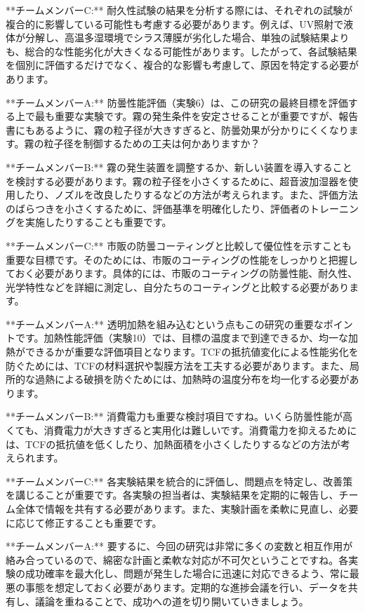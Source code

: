 \documentclass{article}
\begin{document}
**チームメンバーC:**  耐久性試験の結果を分析する際には、それぞれの試験が複合的に影響している可能性も考慮する必要があります。例えば、UV照射で液体が分解し、高温多湿環境でシラス薄膜が劣化した場合、単独の試験結果よりも、総合的な性能劣化が大きくなる可能性があります。したがって、各試験結果を個別に評価するだけでなく、複合的な影響も考慮して、原因を特定する必要があります。

**チームメンバーA:**  防曇性能評価（実験6）は、この研究の最終目標を評価する上で最も重要な実験です。霧の発生条件を安定させることが重要ですが、報告書にもあるように、霧の粒子径が大きすぎると、防曇効果が分かりにくくなります。霧の粒子径を制御するための工夫は何かありますか？

**チームメンバーB:**  霧の発生装置を調整するか、新しい装置を導入することを検討する必要があります。霧の粒子径を小さくするために、超音波加湿器を使用したり、ノズルを改良したりするなどの方法が考えられます。また、評価方法のばらつきを小さくするために、評価基準を明確化したり、評価者のトレーニングを実施したりすることも重要です。

**チームメンバーC:**  市販の防曇コーティングと比較して優位性を示すことも重要な目標です。そのためには、市販のコーティングの性能をしっかりと把握しておく必要があります。具体的には、市販のコーティングの防曇性能、耐久性、光学特性などを詳細に測定し、自分たちのコーティングと比較する必要があります。

**チームメンバーA:**  透明加熱を組み込むという点もこの研究の重要なポイントです。加熱性能評価（実験10）では、目標の温度まで到達できるか、均一な加熱ができるかが重要な評価項目となります。TCFの抵抗値変化による性能劣化を防ぐためには、TCFの材料選択や製膜方法を工夫する必要があります。また、局所的な過熱による破損を防ぐためには、加熱時の温度分布を均一化する必要があります。

**チームメンバーB:**  消費電力も重要な検討項目ですね。いくら防曇性能が高くても、消費電力が大きすぎると実用化は難しいです。消費電力を抑えるためには、TCFの抵抗値を低くしたり、加熱面積を小さくしたりするなどの方法が考えられます。

**チームメンバーC:**  各実験結果を統合的に評価し、問題点を特定し、改善策を講じることが重要です。各実験の担当者は、実験結果を定期的に報告し、チーム全体で情報を共有する必要があります。また、実験計画を柔軟に見直し、必要に応じて修正することも重要です。

**チームメンバーA:**  要するに、今回の研究は非常に多くの変数と相互作用が絡み合っているので、綿密な計画と柔軟な対応が不可欠ということですね。各実験の成功確率を最大化し、問題が発生した場合に迅速に対応できるよう、常に最悪の事態を想定しておく必要があります。定期的な進捗会議を行い、データを共有し、議論を重ねることで、成功への道を切り開いていきましょう。
\end{document}
